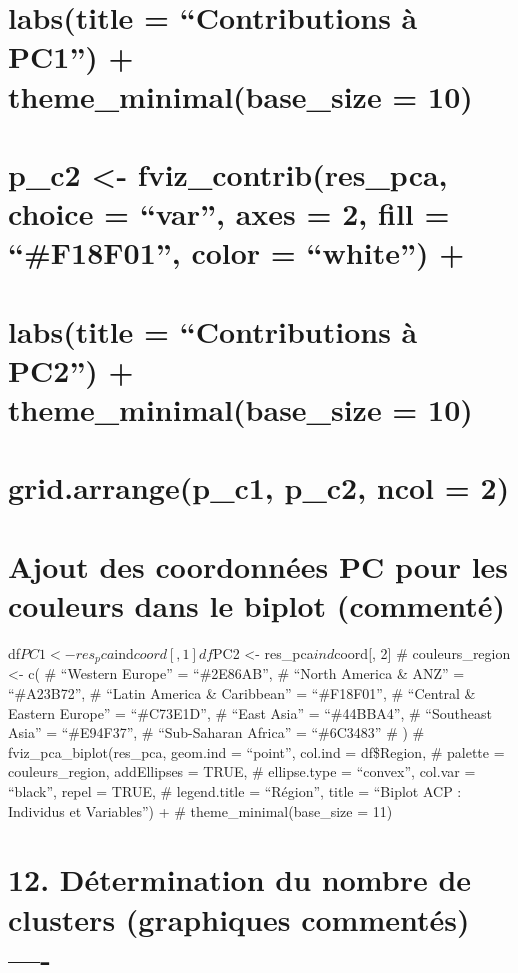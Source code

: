 \documentclass[
]{article}
\begin{document}
\section{labs(title = ``Contributions à PC1'') +
theme\_minimal(base\_size =
10)}\label{labstitle-contributions-uxe0-pc1-theme_minimalbase_size-10}

\section{p\_c2 \textless- fviz\_contrib(res\_pca, choice = ``var'', axes
= 2, fill = ``\#F18F01'', color = ``white'')
+}\label{p_c2---fviz_contribres_pca-choice-var-axes-2-fill-f18f01-color-white}

\section{labs(title = ``Contributions à PC2'') +
theme\_minimal(base\_size =
10)}\label{labstitle-contributions-uxe0-pc2-theme_minimalbase_size-10}

\section{grid.arrange(p\_c1, p\_c2, ncol =
2)}\label{grid.arrangep_c1-p_c2-ncol-2}

\section{Ajout des coordonnées PC pour les couleurs dans le biplot
(commenté)}\label{ajout-des-coordonnuxe9es-pc-pour-les-couleurs-dans-le-biplot-commentuxe9}

df\(PC1 <- res_pca\)ind\(coord[, 1]
df\)PC2 \textless- res\_pca\(ind\)coord{[}, 2{]} \# couleurs\_region
\textless- c( \# ``Western Europe'' = ``\#2E86AB'', \# ``North America
\& ANZ'' = ``\#A23B72'', \# ``Latin America \& Caribbean'' =
``\#F18F01'', \# ``Central \& Eastern Europe'' = ``\#C73E1D'', \# ``East
Asia'' = ``\#44BBA4'', \# ``Southeast Asia'' = ``\#E94F37'', \#
``Sub-Saharan Africa'' = ``\#6C3483'' \# ) \#
fviz\_pca\_biplot(res\_pca, geom.ind = ``point'', col.ind = df\$Region,
\# palette = couleurs\_region, addEllipses = TRUE, \# ellipse.type =
``convex'', col.var = ``black'', repel = TRUE, \# legend.title =
``Région'', title = ``Biplot ACP : Individus et Variables'') + \#
theme\_minimal(base\_size = 11)

\section{12. Détermination du nombre de clusters (graphiques commentés)
----}\label{duxe9termination-du-nombre-de-clusters-graphiques-commentuxe9s--}
\end{document}
